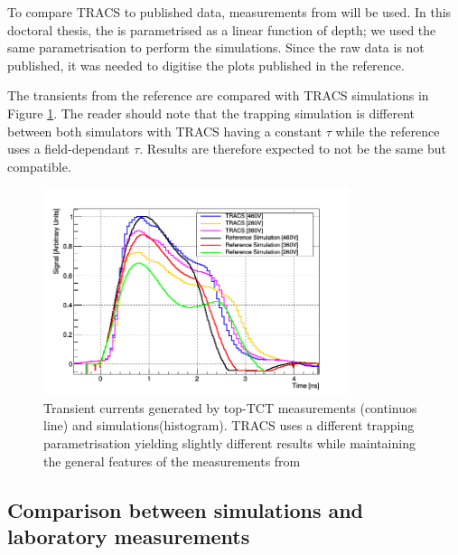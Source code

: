 To compare TRACS to published data, measurements from \cite{Pholsen} will be used. In this doctoral thesis, the \neff is parametrised as a linear function of depth; we used the same parametrisation to perform the simulations. Since the raw data is not published, it was needed to digitise the plots published in the reference.
%

The transients from the reference are compared with TRACS simulations in Figure \ref{fig:PholsenTransient}.  The reader should note that the trapping simulation is different between both simulators with TRACS having a constant $\tau$ while the reference uses a field-dependant $\tau$. Results are therefore expected to not be the same but compatible.

\begin{figure}[H]
	\centering
	\includegraphics[width=0.8\textwidth]{Pohlsen_scr.png}
	\caption{Transient currents generated by top-TCT measurements (continuos line) and simulations(histogram). TRACS uses a different trapping parametrisation yielding slightly different results while maintaining the general features of the measurements from \cite{Pholsen}}
	\label{fig:PholsenTransient}
\end{figure}


\subsection{Comparison between simulations and laboratory measurements}


